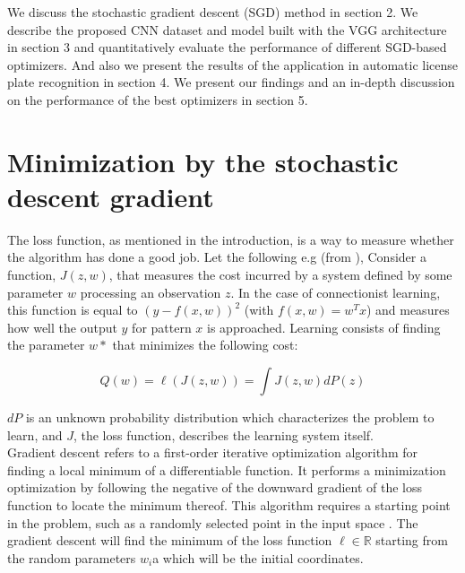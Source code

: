 \documentclass[lnbip]{svmultln}
\begin{document}
	We discuss the stochastic gradient descent (SGD) method in section 2. We describe the proposed CNN dataset and model built with the VGG architecture in section 3 and quantitatively evaluate the performance of different SGD-based optimizers. And also we present the results of the application in automatic license plate recognition in section 4. We present our findings and an in-depth discussion on the performance of the best optimizers in section 5.
	

\section{Minimization by the stochastic descent gradient}
	The loss function, as mentioned in the introduction, is a way to measure whether the algorithm has done a good job.  
	Let the following e.g (from \cite[]{bottou1991stochastic}), Consider a function, $J(z,w)$, that measures the cost incurred by a system defined by some parameter $w$ processing an observation $z$. In the case of connectionist learning, this function is equal to $(y-f(x,w))^2$ (with $f(x,w) = w^Tx$) and measures how well the output $y$ for pattern $x$ is approached. Learning consists of finding the parameter $w*$ that minimizes the following cost:
	
	\begin{equation}
		Q(w) = \ell(J(z,w)) = \int J(z,w)dP(z)
	\end{equation}
	
	$dP$ is an unknown probability distribution which characterizes the problem to learn, and $J$, the loss function, describes the learning system itself.\\
	
	Gradient descent refers to a first-order iterative optimization algorithm for finding a local minimum of a differentiable function. It performs a minimization optimization by following the negative of the downward gradient of the loss function to locate the minimum thereof. This algorithm requires a starting point in the problem, such as a randomly selected point in the input space \cite[]{bottou2012stochastic}.
	The gradient descent will find the minimum of the loss function $\ell \in \mathbb{R}$ starting from the random parameters $w_i$a which will be the initial coordinates.
	
\end{document}
